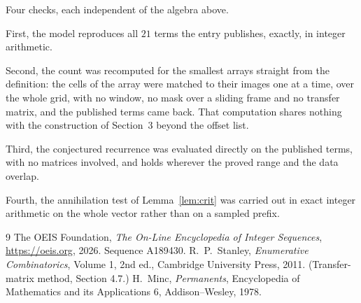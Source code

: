 \documentclass[11pt,a4paper]{article}
\theoremstyle{plain}
\theoremstyle{definition}
\begin{document}
Four checks, each independent of the algebra above.

First, the model reproduces all $21$ terms the entry publishes, exactly, in integer
arithmetic.

Second, the count was recomputed for the smallest arrays straight from the definition: the
cells of the array were matched to their images one at a time, over the whole grid, with no
window, no mask over a sliding frame and no transfer matrix, and the published terms came back.
That computation shares nothing with the construction of Section~3 beyond the offset list.

Third, the conjectured recurrence was evaluated directly on the published terms, with no
matrices involved, and holds wherever the proved range and the data overlap.

Fourth, the annihilation test of Lemma~\ref{lem:crit} was carried out in exact integer
arithmetic on the whole vector rather than on a sampled prefix.

\begin{thebibliography}{9}
 The OEIS Foundation, \emph{The On-Line Encyclopedia of Integer
Sequences}, \url{https://oeis.org}, 2026. Sequence A189430.
 R.~P.~Stanley, \emph{Enumerative Combinatorics}, Volume 1, 2nd ed.,
Cambridge University Press, 2011. (Transfer-matrix method, Section 4.7.)
 H.~Minc, \emph{Permanents}, Encyclopedia of Mathematics and its
Applications 6, Addison--Wesley, 1978.
\end{thebibliography}
\end{document}
